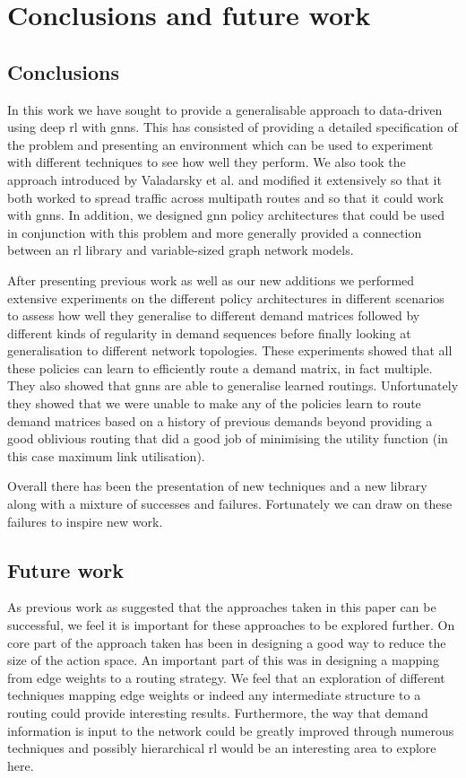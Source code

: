 \chapter{Conclusions and future work}
\label{chapter:conclusions}

\section{Conclusions}
In this work we have sought to provide a generalisable approach to data-driven using deep \ac{rl} with \acp{gnn}. This has consisted of providing a detailed specification of the problem and presenting an environment which can be used to experiment with different techniques to see how well they perform. We also took the approach introduced by Valadarsky et al. and modified it extensively so that it both worked to spread traffic across multipath routes and so that it could work with \acp{gnn}. In addition, we designed \ac{gnn} policy architectures that could be used in conjunction with this problem and more generally provided a connection between an \ac{rl} library and variable-sized graph network models.

After presenting previous work as well as our new additions we performed extensive experiments on the different policy architectures in different scenarios to assess how well they generalise to different demand matrices followed by different kinds of regularity in demand sequences before finally looking at generalisation to different network topologies. These experiments showed that all these policies can learn to efficiently route a demand matrix, in fact multiple. They also showed that \acp{gnn} are able to generalise learned routings. Unfortunately they showed that we were unable to make any of the policies learn to route demand matrices based on a history of previous demands beyond providing a good oblivious routing that did a good job of minimising the utility function (in this case maximum link utilisation).

Overall there has been the presentation of new techniques and a new library along with a mixture of successes and failures. Fortunately we can draw on these failures to inspire new work.


\section{Future work}
As previous work as suggested that the approaches taken in this paper can be successful, we feel it is important for these approaches to be explored further. On core part of the approach taken has been in designing a good way to reduce the size of the action space. An important part of this was in designing a mapping from edge weights to a routing strategy. We feel that an exploration of different techniques mapping edge weights or indeed any intermediate structure to a routing could provide interesting results. Furthermore, the way that demand information is input to the network could be greatly improved through numerous techniques and possibly hierarchical \ac{rl} would be an interesting area to explore here.

